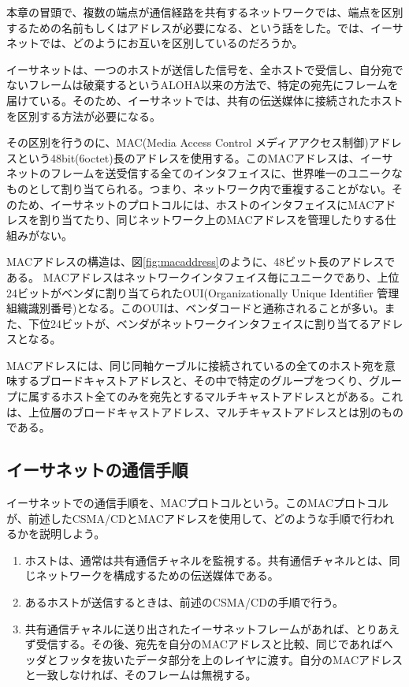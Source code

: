 本章の冒頭で、複数の端点が通信経路を共有するネットワークでは、端点を区別するための名前もしくはアドレスが必要になる、という話をした。では、イーサネットでは、どのようにお互いを区別しているのだろうか。

イーサネットは、一つのホストが送信した信号を、全ホストで受信し、自分宛でないフレームは破棄するというALOHA以来の方法で、特定の宛先にフレームを届けている。そのため、イーサネットでは、共有の伝送媒体に接続されたホストを区別する方法が必要になる。

その区別を行うのに、MAC(Media Access Control メディアアクセス制御)アドレスという48bit(6octet)長のアドレスを使用する。このMACアドレスは、イーサネットのフレームを送受信する全てのインタフェイスに、世界唯一のユニークなものとして割り当てられる。つまり、ネットワーク内で重複することがない。そのため、イーサネットのプロトコルには、ホストのインタフェイスにMACアドレスを割り当てたり、同じネットワーク上のMACアドレスを管理したりする仕組みがない。



MACアドレスの構造は、図\ref{fig:macaddress}のように、48ビット長のアドレスである。
MACアドレスはネットワークインタフェイス毎にユニークであり、上位24ビットがベンダに割り当てられたOUI(Organizationally Unique Identifier 管理組織識別番号)となる。このOUIは、ベンダコードと通称されることが多い。また、下位24ビットが、ベンダがネットワークインタフェイスに割り当てるアドレスとなる。

MACアドレスには、同じ同軸ケーブルに接続されているの全てのホスト宛を意味するブロードキャストアドレスと、その中で特定のグループをつくり、グループに属するホスト全てのみを宛先とするマルチキャストアドレスとがある。これは、上位層のブロードキャストアドレス、マルチキャストアドレスとは別のものである。

\subsection{イーサネットの通信手順}

イーサネットでの通信手順を、MACプロトコルという。このMACプロトコルが、前述したCSMA/CDとMACアドレスを使用して、どのような手順で行われるかを説明しよう。
\begin{enumerate}
\item ホストは、通常は共有通信チャネルを監視する。共有通信チャネルとは、同じネットワークを構成するための伝送媒体である。
\item あるホストが送信するときは、前述のCSMA/CDの手順で行う。
\item 共有通信チャネルに送り出されたイーサネットフレームがあれば、とりあえず受信する。その後、宛先を自分のMACアドレスと比較、同じであればヘッダとフッタを抜いたデータ部分を上のレイヤに渡す。自分のMACアドレスと一致しなければ、そのフレームは無視する。
\end{enumerate}

